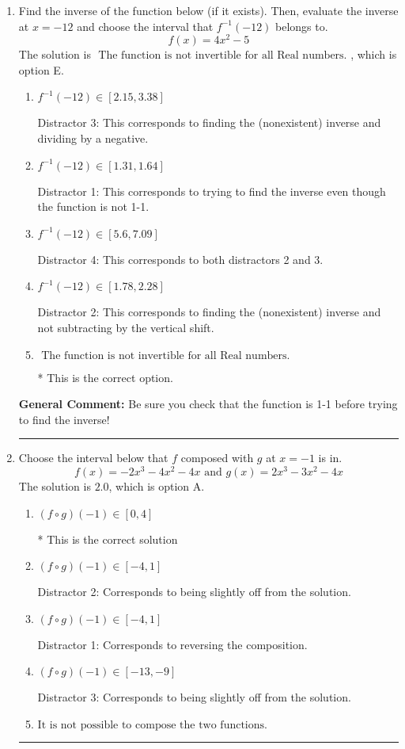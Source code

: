 \documentclass{extbook}[14pt]
\newcommand{\litem}[1]{\item #1

\rule{\textwidth}{0.4pt}}
\begin{document}
\begin{enumerate}\litem{
Find the inverse of the function below (if it exists). Then, evaluate the inverse at $x = -12$ and choose the interval that $f^{-1}(-12)$ belongs to.
\[ f(x) = 4 x^2 - 5 \]The solution is \( \text{ The function is not invertible for all Real numbers. } \), which is option E.\begin{enumerate}[label=\Alph*.]
\item \( f^{-1}(-12) \in [2.15, 3.38] \)

 Distractor 3: This corresponds to finding the (nonexistent) inverse and dividing by a negative.
\item \( f^{-1}(-12) \in [1.31, 1.64] \)

 Distractor 1: This corresponds to trying to find the inverse even though the function is not 1-1. 
\item \( f^{-1}(-12) \in [5.6, 7.09] \)

 Distractor 4: This corresponds to both distractors 2 and 3.
\item \( f^{-1}(-12) \in [1.78, 2.28] \)

 Distractor 2: This corresponds to finding the (nonexistent) inverse and not subtracting by the vertical shift.
\item \( \text{ The function is not invertible for all Real numbers. } \)

* This is the correct option.
\end{enumerate}

\textbf{General Comment:} Be sure you check that the function is 1-1 before trying to find the inverse!
}
\litem{
Choose the interval below that $f$ composed with $g$ at $x=-1$ is in.
\[ f(x) = -2x^{3} -4 x^{2} -4 x \text{ and } g(x) = 2x^{3} -3 x^{2} -4 x \]The solution is \( 2.0 \), which is option A.\begin{enumerate}[label=\Alph*.]
\item \( (f \circ g)(-1) \in [0, 4] \)

* This is the correct solution
\item \( (f \circ g)(-1) \in [-4, 1] \)

 Distractor 2: Corresponds to being slightly off from the solution.
\item \( (f \circ g)(-1) \in [-4, 1] \)

 Distractor 1: Corresponds to reversing the composition.
\item \( (f \circ g)(-1) \in [-13, -9] \)

 Distractor 3: Corresponds to being slightly off from the solution.
\item \( \text{It is not possible to compose the two functions.} \)



\end{enumerate}}
\end{enumerate}
\end{document}
